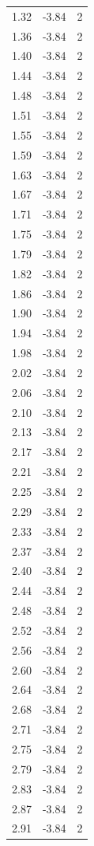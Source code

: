 \begin{longtable}{lrr}
  1.32 & -3.84 & 2 \\
  1.36 & -3.84 & 2 \\
  1.40 & -3.84 & 2 \\
  1.44 & -3.84 & 2 \\
  1.48 & -3.84 & 2 \\
  1.51 & -3.84 & 2 \\
  1.55 & -3.84 & 2 \\
  1.59 & -3.84 & 2 \\
  1.63 & -3.84 & 2 \\
  1.67 & -3.84 & 2 \\
  1.71 & -3.84 & 2 \\
  1.75 & -3.84 & 2 \\
  1.79 & -3.84 & 2 \\
  1.82 & -3.84 & 2 \\
  1.86 & -3.84 & 2 \\
  1.90 & -3.84 & 2 \\
  1.94 & -3.84 & 2 \\
  1.98 & -3.84 & 2 \\
  2.02 & -3.84 & 2 \\
  2.06 & -3.84 & 2 \\
  2.10 & -3.84 & 2 \\
  2.13 & -3.84 & 2 \\
  2.17 & -3.84 & 2 \\
  2.21 & -3.84 & 2 \\
  2.25 & -3.84 & 2 \\
  2.29 & -3.84 & 2 \\
  2.33 & -3.84 & 2 \\
  2.37 & -3.84 & 2 \\
  2.40 & -3.84 & 2 \\
  2.44 & -3.84 & 2 \\
  2.48 & -3.84 & 2 \\
  2.52 & -3.84 & 2 \\
  2.56 & -3.84 & 2 \\
  2.60 & -3.84 & 2 \\
  2.64 & -3.84 & 2 \\
  2.68 & -3.84 & 2 \\
  2.71 & -3.84 & 2 \\
  2.75 & -3.84 & 2 \\
  2.79 & -3.84 & 2 \\
  2.83 & -3.84 & 2 \\
  2.87 & -3.84 & 2 \\
  2.91 & -3.84 & 2 \\

\end{longtable}
